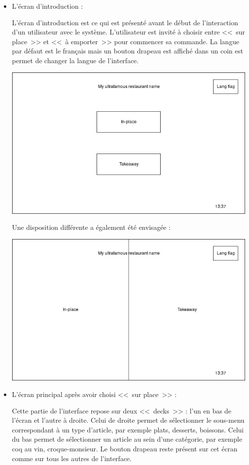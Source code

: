\documentclass[a4paper,12pt]{article}
\begin{document}
\begin{itemize}

\item L'écran d'introduction :

L'écran d'introduction est ce qui est présenté avant le début de l'interaction d'un utilisateur avec le système.
L'utilisateur est invité à choisir entre <<~sur place~>> et <<~à emporter~>> pour commencer sa commande. La langue par
défaut est le français mais un bouton drapeau est affiché dans un coin est permet de changer la langue de l'interface.

\includegraphics[width=13cm]{intro_screen.jpg}

Une disposition différente a également été envisagée :

\includegraphics[width=13cm]{alt_intro_screen.jpg}

\item L'écran principal après avoir choisi <<~sur place~>> :

Cette partie de l'interface repose sur deux <<~decks~>> : l'un en bas de l'écran et l'autre à droite. Celui de droite
permet de sélectionner le sous-menu correspondant à un type d'article, par exemple plats, desserts, boissons. Celui
du bas permet de sélectionner un article au sein d'une catégorie, par exemple coq au vin, croque-monsieur. Le bouton
drapeau reste présent sur cet écran comme sur tous les autres de l'interface.


\end{itemize}
\end{document}
